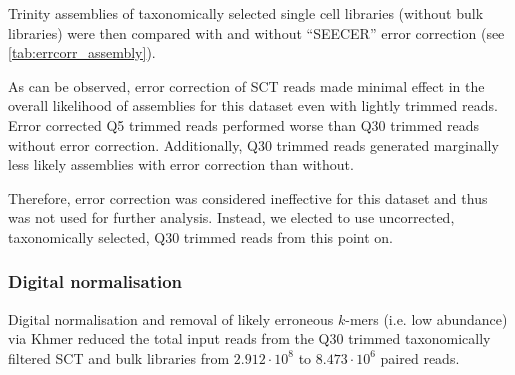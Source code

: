 Trinity assemblies of taxonomically selected single cell libraries 
(without bulk libraries) were then compared with and without ``SEECER'' 
error correction (see \cref{tab:errcorr_assembly}).
\begin{table}[h!]

    \caption[Effect of Error Correction on Assembly]{Naive Trinity assembly of Q5 and Q30 trimmed taxonomically selected single cell libraries
        with and without SEECER error correction. While assembly likelihood increases after
    error correction for Q5 trimmed reads it is still lower than Q30 uncorrected.  For Q30
trimmed reads error correction marginally decreases assembly likelihood.}
    \label{tab:errcorr_assembly}
\end{table}

As can be observed, error correction of SCT reads made minimal effect in the overall likelihood
of assemblies for this dataset even with lightly trimmed reads.  Error corrected Q5
trimmed reads performed worse than Q30 trimmed reads without error correction. 
Additionally, Q30 trimmed reads generated marginally less likely assemblies with 
error correction than without. 

Therefore, error correction
was considered ineffective for this dataset and thus was not 
used for further analysis.  Instead, we elected to use uncorrected, taxonomically selected,
Q30 trimmed reads from this point on. 

\subsubsection{Digital normalisation} 
Digital normalisation and removal of likely erroneous \(k\)-mers (i.e. low abundance) 
via Khmer reduced the total input reads from the Q30 trimmed taxonomically
filtered SCT and bulk libraries from 
\(2.912\cdot 10^{8}\) to \(8.473\cdot 10^6\) paired reads.

